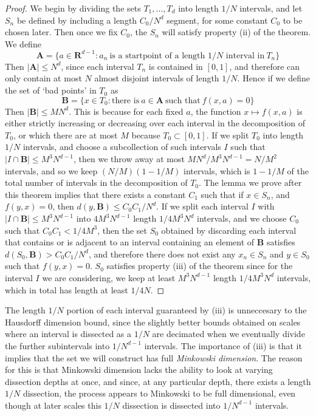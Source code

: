 \begin{proof}
    We begin by dividing the sets $T_1, \dots, T_d$ into length $1/N$ intervals, and let $S_n$ be defined by including a length $C_0/N^d$ segment, for some constant $C_0$ to be chosen later. Then once we fix $C_0$, the $S_n$ will satisfy property (ii) of the theorem. We define
    \[ \mathbf{A} = \{ a \in \mathbf{R}^{d-1} : a_n\ \text{is a startpoint of a length $1/N$ interval in}\ T_n \} \]
    Then $|\mathbf{A}| \leq N^d$, since each interval $T_n$ is contained in $[0,1]$, and therefore can only contain at most $N$ almost disjoint intervals of length $1/N$. Hence if we define the set of `bad points' in $T_0$ as
    \[ \mathbf{B} = \{ x \in T_0: \text{there is}\ a \in \mathbf{A}\ \text{such that}\ f(x,a) = 0 \} \]
    Then $|\mathbf{B}| \leq MN^d$. This is because for each fixed $a$, the function $x \mapsto f(x,a)$ is either strictly increasing or decreasing over each interval in the decomposition of $T_0$, or which there are at most $M$ because $T_0 \subset [0,1]$. If we split $T_0$ into length $1/N$ intervals, and choose a subcollection of such intervals $I$ such that $|I \cap \mathbf{B}| \leq M^3N^{d-1}$, then we throw away at most $MN^d/M^3N^{d-1} = N/M^2$ intervals, and so we keep $(N/M)(1 - 1/M)$ intervals, which is $1 - 1/M$ of the total number of intervals in the decomposition of $T_0$. The lemma we prove after this theorem implies that there exists a constant $C_1$ such that if $x \in S_n$, and $f(y,x) = 0$, then $d(y,\mathbf{B}) \leq C_0C_1/N^d$. If we split each interval $I$ with $|I \cap \mathbf{B}| \leq M^3N^{d-1}$ into $4M^3N^{d-1}$ length $1/4M^3N^d$ intervals, and we choose $C_0$ such that $C_0C_1 < 1/4M^3$, then the set $S_0$ obtained by discarding each interval that contains or is adjacent to an interval containing an element of $\mathbf{B}$ satisfies $d(S_0,\mathbf{B}) > C_0C_1/N^d$, and therefore there does not exist any $x_n \in S_n$ and $y \in S_0$ such that $f(y,x) = 0$. $S_0$ satisfies property (iii) of the theorem since for the interval $I$ we are considering, we keep at least $M^3N^{d-1}$ length $1/4M^3N^d$ intervals, which in total has length at least $1/4N$.
\end{proof}

\begin{remark}
    The length $1/N$ portion of each interval guaranteed by (iii) is unneccesary to the Hausdorff dimension bound, since the slightly better bounds obtained on scales where an interval is dissected as a $1/N$ are decimated when we eventually divide the further subintervals into $1/N^{d-1}$ intervals. The importance of (iii) is that it implies that the set we will construct has full {\it Minkowski dimension}. The reason for this is that Minkowski dimension lacks the ability to look at varying dissection depths at once, and since, at any particular depth, there exists a length $1/N$ dissection, the process appears to Minkowski to be full dimensional, even though at later scales this $1/N$ dissection is dissected into $1/N^{d-1}$ intervals.
\end{remark}

